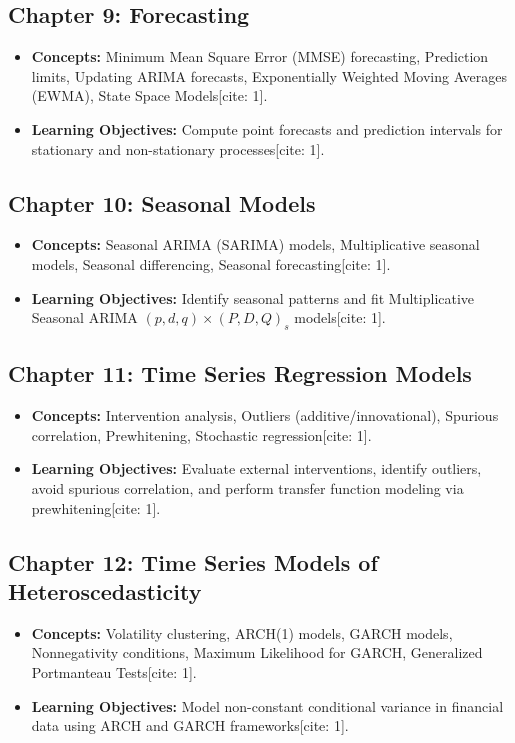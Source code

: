 \documentclass{article}
\begin{document}
\subsection*{Chapter 9: Forecasting}
\begin{itemize}
    \item \textbf{Concepts:} Minimum Mean Square Error (MMSE) forecasting, Prediction limits, Updating ARIMA forecasts, Exponentially Weighted Moving Averages (EWMA), State Space Models[cite: 1].
    \item \textbf{Learning Objectives:} Compute point forecasts and prediction intervals for stationary and non-stationary processes[cite: 1].
\end{itemize}

\subsection*{Chapter 10: Seasonal Models}
\begin{itemize}
    \item \textbf{Concepts:} Seasonal ARIMA (SARIMA) models, Multiplicative seasonal models, Seasonal differencing, Seasonal forecasting[cite: 1].
    \item \textbf{Learning Objectives:} Identify seasonal patterns and fit Multiplicative Seasonal ARIMA $(p,d,q) \times (P,D,Q)_s$ models[cite: 1].
\end{itemize}

\subsection*{Chapter 11: Time Series Regression Models}
\begin{itemize}
    \item \textbf{Concepts:} Intervention analysis, Outliers (additive/innovational), Spurious correlation, Prewhitening, Stochastic regression[cite: 1].
    \item \textbf{Learning Objectives:} Evaluate external interventions, identify outliers, avoid spurious correlation, and perform transfer function modeling via prewhitening[cite: 1].
\end{itemize}

\subsection*{Chapter 12: Time Series Models of Heteroscedasticity}
\begin{itemize}
    \item \textbf{Concepts:} Volatility clustering, ARCH(1) models, GARCH models, Nonnegativity conditions, Maximum Likelihood for GARCH, Generalized Portmanteau Tests[cite: 1].
    \item \textbf{Learning Objectives:} Model non-constant conditional variance in financial data using ARCH and GARCH frameworks[cite: 1].
\end{itemize}
\end{document}
